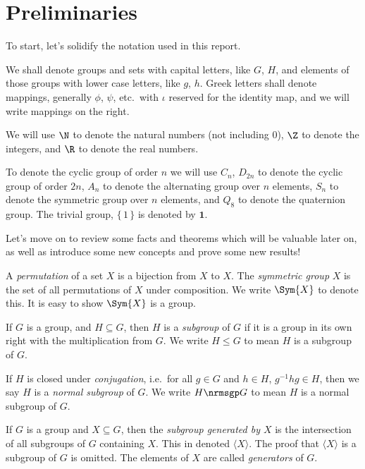 \section{Preliminaries}
To start, let's solidify the notation used in this report.

We shall denote groups and sets with capital letters, like \(G\), \(H\), and elements of those groups with lower case
letters, like \(g\), \(h\).
Greek letters shall denote mappings, generally \(\phi\), \(\psi\), etc.\ with \(\iota\) reserved for the identity map,
and we will write mappings on the right.

We will use \(\N\) to denote the natural numbers (not including 0), \(\Z\) to denote the integers, and \(\R\) to denote
the real numbers.

To denote the cyclic group of order \(n\) we will use \(C_n\), \(D_{2n}\) to denote the cyclic group of order \(2n\),
\(A_n\) to denote the alternating group over \(n\) elements, \(S_n\) to denote the symmetric group over \(n\)
elements, and \(Q_8\) to denote the quaternion group.
The trivial group, \(\{\, 1\, \}\) is denoted by \(\bm{1}\).

Let's move on to review some facts and theorems which will be valuable later on, as well as introduce some new concepts
and prove some new results!

\begin{definition}
    A \emph{permutation} of a set \(X\) is a bijection from \(X\) to \(X\).
    The \emph{symmetric group} \(X\) is the set of all permutations of \(X\) under composition.
    We write \(\Sym{X}\) to denote this.
    It is easy to show \(\Sym{X}\) is a group.
\end{definition}

\begin{definition}
    If \(G\) is a group, and \(H \subseteq G\), then \(H\) is a \emph{subgroup} of \(G\) if it is a group in its own right with
    the multiplication from \(G\).
    We write \(H \leqslant G\) to mean \(H\) is a subgroup of \(G\).

    If \(H\) is closed under \emph{conjugation}, i.e.\ for all \(g \in G\) and \(h \in H\), \(g^{-1}hg \in H\), then we
    say \(H\) is a \emph{normal subgroup} of \(G\).
    We write \(H \nrmsgp G\) to mean \(H\) is a normal subgroup of \(G\).
\end{definition}

\begin{definition}
    If \(G\) is a group and \(X \subseteq G\), then the \emph{subgroup generated by \(X\)} is the intersection of all
    subgroups of \(G\) containing \(X\).
    This in denoted \(\langle X \rangle\).
    The proof that \(\langle X \rangle\) is a subgroup of \(G\) is omitted.
    The elements of \(X\) are called \emph{generators} of \(G\).
\end{definition}

